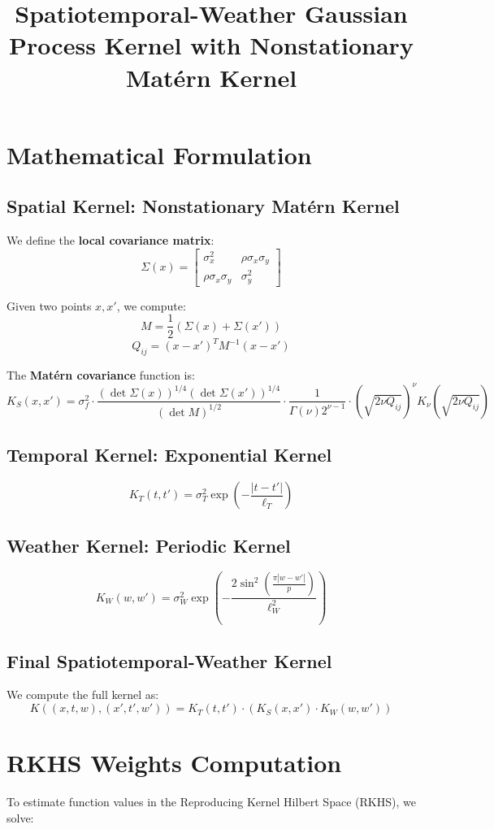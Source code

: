 \documentclass{article}
\title{Spatiotemporal-Weather Gaussian Process Kernel with Nonstationary Matérn Kernel}
\author{}
\date{}
\begin{document}
\maketitle

\section{Mathematical Formulation}

\subsection{Spatial Kernel: Nonstationary Matérn Kernel}
We define the \textbf{local covariance matrix}:
\[
\Sigma(x) =
\begin{bmatrix}
\sigma_x^2 & \rho \sigma_x \sigma_y \\
\rho \sigma_x \sigma_y & \sigma_y^2
\end{bmatrix}
\]

Given two points \( x, x' \), we compute:
\[
M = \frac{1}{2} \left( \Sigma(x) + \Sigma(x') \right)
\]
\[
Q_{ij} = (x - x')^T M^{-1} (x - x')
\]

The \textbf{Matérn covariance} function is:
\[
K_S(x, x') = \sigma_f^2 \cdot \frac{(\det \Sigma(x))^{1/4} (\det \Sigma(x'))^{1/4}}{(\det M)^{1/2}} 
\cdot \frac{1}{\Gamma{\left(\nu\right)} 2^{\nu - 1}} \cdot \left( \sqrt{2\nu Q_{ij}} \right)^\nu K_\nu \left( \sqrt{2\nu Q_{ij}} \right)
\]

\subsection{Temporal Kernel: Exponential Kernel}
\[
K_T(t, t') = \sigma_T^2 \exp \left( -\frac{|t - t'|}{\ell_T} \right)
\]

\subsection{Weather Kernel: Periodic Kernel}
\[
K_W(w, w') = \sigma_W^2 \exp \left( -\frac{2 \sin^2{\left(\frac{\pi |w - w'|}{p}\right)}}{\ell_W^2} \right)
\]

\subsection{Final Spatiotemporal-Weather Kernel}
We compute the full kernel as:
\[
K((x,t,w), (x',t',w')) = K_T(t, t') \cdot \left( K_S(x, x') \cdot K_W(w, w') \right)
\]

\section{RKHS Weights Computation}
To estimate function values in the Reproducing Kernel Hilbert Space (RKHS), we solve:
\end{document}
